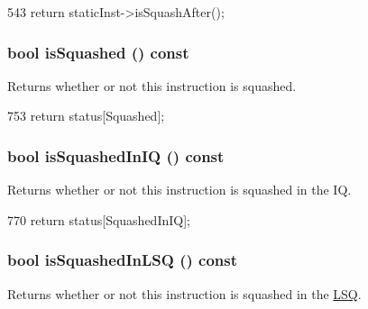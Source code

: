 \begin{DoxyCode}
543 { return staticInst->isSquashAfter(); }
\end{DoxyCode}
\hypertarget{classBaseDynInst_add8df091bd836cf92c6987990d130b83}{
\subsubsection[{isSquashed}]{\setlength{\rightskip}{0pt plus 5cm}bool isSquashed () const}}
\label{classBaseDynInst_add8df091bd836cf92c6987990d130b83}
Returns whether or not this instruction is squashed. 


\begin{DoxyCode}
753 { return status[Squashed]; }
\end{DoxyCode}
\hypertarget{classBaseDynInst_aa2983ad327b9f2045350cc639d6e23bd}{
\subsubsection[{isSquashedInIQ}]{\setlength{\rightskip}{0pt plus 5cm}bool isSquashedInIQ () const}}
\label{classBaseDynInst_aa2983ad327b9f2045350cc639d6e23bd}
Returns whether or not this instruction is squashed in the IQ. 


\begin{DoxyCode}
770 { return status[SquashedInIQ]; }
\end{DoxyCode}
\hypertarget{classBaseDynInst_a103500ce68cd17d86796ff2d6ecf1445}{
\subsubsection[{isSquashedInLSQ}]{\setlength{\rightskip}{0pt plus 5cm}bool isSquashedInLSQ () const}}
\label{classBaseDynInst_a103500ce68cd17d86796ff2d6ecf1445}
Returns whether or not this instruction is squashed in the \hyperlink{classLSQ}{LSQ}. 


